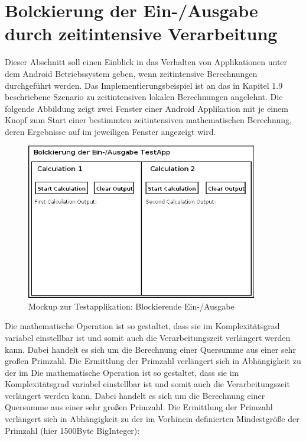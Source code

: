 \documentclass[12pt,oneside,a4paper,bibtotoc,liststotoc]{scrreprt}
\begin{document}
\section{Bolckierung der Ein-/Ausgabe durch zeitintensive Verarbeitung}
Dieser Abschnitt soll einen Einblick in das Verhalten von Applikationen unter dem Android Betriebssystem geben, wenn zeitintensive Berechnungen durchgeführt werden. Das Implementierungsbeispiel ist an das in Kapitel 1.9 beschriebene Szenario zu zeitintensiven lokalen Berechnungen angelehnt.
Die folgende Abbildung zeigt zwei Fenster einer Android Applikation mit je einem Knopf zum Start einer bestimmten zeitintensiven mathematischen Berechnung, deren Ergebnisse auf im jeweiligen Fenster angezeigt wird.
\begin{figure}[H]
  \begin{centering}
    \includegraphics[width=0.9\textwidth]{img/BlockingIO_testApp_Mockup.png}
    \caption{Mockup zur Testapplikation: Blockierende Ein-/Ausgabe}
    \label{BlockingIO_testApp_Mockup}
  \end{centering}
\end{figure}
Die mathematische Operation ist so gestaltet, dass sie im Komplexitätsgrad variabel einstellbar ist und somit auch die Verarbeitungszeit verlängert werden kann. Dabei handelt es sich um die Berechnung einer Quersumme aus einer sehr großen Primzahl. Die Ermittlung der Primzahl verlängert sich in Abhängigkeit zu der im Die mathematische Operation ist so gestaltet, dass sie im Komplexitätsgrad variabel einstellbar ist und somit auch die Verarbeitungszeit verlängert werden kann. Dabei handelt es sich um die Berechnung einer Quersumme aus einer sehr großen Primzahl. Die Ermittlung der Primzahl verlängert sich in Abhängigkeit zu der im Vorhinein definierten Mindestgröße der Primzahl (hier 1500Byte BigInteger):\newline\newline
\end{document}
